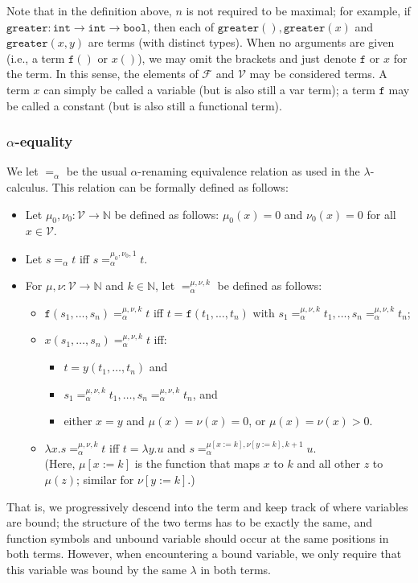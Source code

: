 \documentclass{lmcs}
\theoremstyle{theorem}\newtheorem{theorem}{Theorem}
\theoremstyle{theorem}\newtheorem{lemma}[theorem]{Lemma}
\theoremstyle{theorem}\newtheorem{corollary}[theorem]{Corollary}
\theoremstyle{definition}\newtheorem{definition}[theorem]{Definition}
\theoremstyle{definition}\newtheorem{example}[theorem]{Example}
\newcommand{\N}{\mathbb{N}}
\newcommand{\F}{\mathcal{F}}
\newcommand{\V}{\mathcal{V}}
\newcommand{\identifier}[1]{\mathtt{#1}}
\newcommand{\afun}{\identifier{f}}
\newcommand{\avar}{x}
\newcommand{\bvar}{y}
\newcommand{\cvar}{z}
\newcommand{\abs}[2]{\lambda #1.#2}
\newcommand{\arrtype}{\rightarrow}
\newcommand{\symb}[1]{\mathtt{#1}}
\newcommand{\mysubsection}[1]{\vspace{-12pt}\subsubsection{#1}}
\begin{document}
Note that in the definition above, $n$ is not required to be maximal; for example, if
$\symb{greater} : \mathtt{int} \arrtype \mathtt{int} \arrtype \mathtt{bool}$, then each of
$\symb{greater}(),\symb{greater}(\avar)$ and $\symb{greater}(\avar,\bvar)$ are terms (with
distinct types). When no arguments are given (i.e., a term $\afun()$ or $\avar()$), we may omit
the brackets and just denote $\afun$ or $\avar$ for the term.  In this sense, the elements of $\F$
and $\V$ may be considered terms.
A term $\avar$ can simply be called a variable (but is also still a var term);
a term $\afun$ may be called a constant (but is also still a functional term).

\mysubsection{$\alpha$-equality}
We let $=_\alpha$ be the usual $\alpha$-renaming equivalence relation as used in the
$\lambda$-calculus. This relation can be formally defined as follows:
\begin{itemize}
\item Let $\mu_0,\nu_0 : \V \rightarrow \N$ be defined as follows:
  $\mu_0(\avar) = 0$ and $\nu_0(\avar) = 0$ for all $\avar \in \V$.
\item Let $s =_\alpha t$ iff $s =_\alpha^{\mu_0,\nu_0,1} t$.
\item For $\mu,\nu : \V \rightarrow \N$ and $k \in \N$, let $=_\alpha^{\mu,\nu,k}$ be defined as
  follows:
  \begin{itemize}
  \item $\afun(s_1,\dots,s_n) =_\alpha^{\mu,\nu,k} t$ iff $t = \afun(t_1,\dots,t_n)$ with $s_1
    =_\alpha^{\mu,\nu,k} t_1,\dots,s_n =_\alpha^{\mu,\nu,k} t_n$;
  \item $\avar(s_1,\dots,s_n) =_\alpha^{\mu,\nu,k} t$ iff:
    \begin{itemize}
    \item $t = \bvar(t_1,\dots,t_n)$ and
    \item $s_1 =_\alpha^{\mu,\nu,k} t_1,\dots,s_n =_\alpha^{\mu,\nu,k} t_n$, and
    \item either $\avar = \bvar$ and $\mu(\avar) = \nu(\avar) = 0$,
      or $\mu(\avar) = \nu(\avar) > 0$.
    \end{itemize}
  \item $\abs{\avar}{s} =_\alpha^{\mu,\nu,k} t$ iff
    $t = \abs{\bvar}{u}$ and $s =_\alpha^{\mu[\avar:=k],\nu[\bvar:=k],k+1} u$. \\
    (Here, $\mu[\avar:=k]$ is the function that maps $\avar$ to $k$ and all other $\cvar$ to
    $\mu(\cvar)$; similar for $\nu[\bvar:=k]$.)
  \end{itemize}
\end{itemize}
That is, we progressively descend into the term and keep track of where variables are bound; the
structure of the two terms has to be exactly the same, and function symbols and unbound variable
should occur at the same positions in both terms. However, when encountering a bound variable, we
only require that this variable was bound by the same $\lambda$ in both terms.
\end{document}
